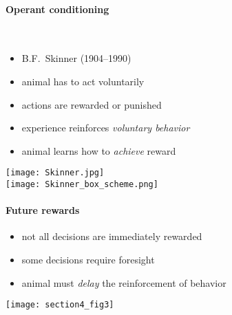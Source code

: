 \paragraph{Operant conditioning}\mbox{}\\
\begin{minipage}{\textwidth}
		\begin{minipage}{7.75cm}
			\begin{itemize}
				\item B.F.~Skinner (1904--1990)
				\vspace{2mm}
				\item animal has to act voluntarily
				\vspace{2mm}
				\item actions are rewarded or punished
				\vspace{2mm}
				\item experience reinforces {\em voluntary behavior}
				\vspace{2mm}
				\item animal learns how to {\em achieve} reward
			\end{itemize} 
		\end{minipage}
		\hfill
		\begin{minipage}{4cm}
			\begin{center}
				\texttt{[image: Skinner.jpg]} \\
				\texttt{[image: Skinner\_box\_scheme.png]} 
			\end{center}
		\end{minipage}
	\end{minipage}
	
\paragraph{Future rewards}
	\begin{itemize}
		\item not all decisions are immediately rewarded
		\vspace{2mm}
		\item some decisions require foresight 
		\vspace{2mm}
		\item animal must {\em delay} the reinforcement of behavior
	\end{itemize}
	
	\vspace{2mm}
	\begin{center}
		\texttt{[image: section4\_fig3]}
	\end{center}

